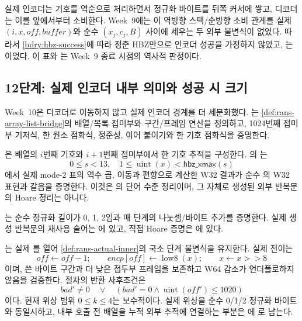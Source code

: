 실제 인코더는 기호를 역순으로 처리하면서 정규화 바이트를 뒤쪽 커서에 쌓고,
디코더는 이를 앞에서부터 소비한다. Week~9에는 이 역방향 스택/순방향 소비
관계를 실제 \((i,x,off,buffer)\)와 순수 \((x_j,c_j,B)\) 사이에 세우는 두 외부
불변식이 없었다. 따라서 \cref{bdry:hbz-success}에 따라 정준 HBZ만으로 인코더
성공을 가정하지 않았고, 는
\statuspartial 이었다. 이 표와 는 Week~9 종료
시점의 역사적 판정이다.

\subsection{12단계: 실제 인코더 내부 의미와 성공 시 크기}

Week~10은 디코더로 이동하지 않고 실제 인코더 경계를 더 세분화했다.
\allowbreak{}는
\cref{def:rans-array-list-bridge}의 배열/목록 접미부와 구간/프레임 연산을
정의하고, 1024번째 접미부 기저식, 한 원소 점화식, 정준성, 이어 붙이기와
한 기호  점화식을 증명한다.

\begin{verified}[배열/목록 접미부와 실제 단어 단계]
\label{thm:rans-array-word-bridge}
\allowbreak{}은 배열의 \(i\)번째 기호와
\(i+1\)번째 접미부에서 한 기호 추적을 구성한다.
\allowbreak{}의
\allowbreak{}는
\[
  0\le s<13,\quad
  1\le\operatorname{uint}(x)<\mathsf{hbz\_xmax}(s)
\]
에서 실제 mode-2 표의 역수 곱, 이동과 편향으로 계산한 W32 결과가 순수
의 W32 표현과 같음을 증명한다. 이것은
의 단어 수준 정리이며, 그 자체로 생성된 외부
반복문의 Hoare 정리는 아니다.
\end{verified}

는 순수 정규화 길이가 0, 1, 2임과
매 단계의 나눗셈/바이트 추가를 증명한다. 실제 생성 반복문의 재사용 술어는
에 있고, 직접 Hoare 증명은
에 있다.

\begin{verified}
\label{thm:rans-actual-inner}
는 실제
를 열어
\cref{def:rans-actual-inner}의 국소 단계 불변식을 유지한다. 실제 전이는
\[
  off\gets off-1;\qquad encp[off]\gets\operatorname{low8}(x);
  \qquad x\gets x\mathbin{\mathtt{>>}}8
\]
이며, 쓴 바이트 구간과 더 낮은 접두부 프레임을 보존하고 W64 감소가
언더플로하지 않음을 검증한다. 절차의 반환 사후조건은
\[
  bad'\ne0\quad\lor\quad(bad'=0\land\operatorname{uint}(off')\le1020)
\]
이다. 현재 위상 범위 \(0\le k\le4\)는 보수적이다. 실제 위상을 순수 0/1/2
정규화 바이트와 동일시하고, 내부 호출 전 배열을 누적 외부 추적에 연결하는
부분은 에 \statuspartial 로 남는다.
\end{verified}

